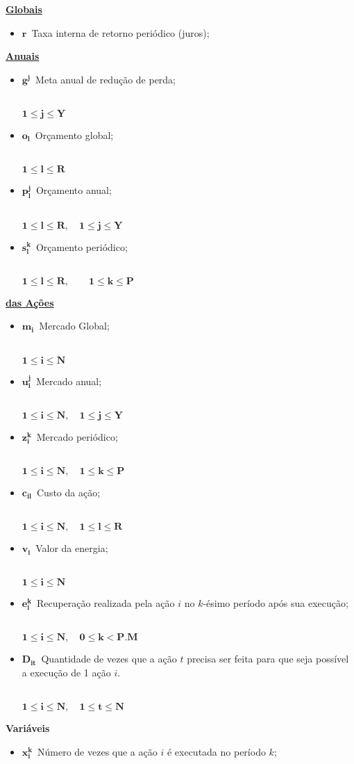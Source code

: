 \documentclass{article}
\newcommand{\topico}[1]{
  \vspace{20pt}
  {\Large \bf #1 }
}
\newcommand{\subtopico}[1]{
  {\large \bf \underline{#1}}
  \\
}
\newcommand{\variavel}[1]{
  { \Large $ \bm{ #1 } \, $}
}
\newcommand{\decorator}[1]{
  {\\ \scriptsize \hspace*{12pt} $ \bm{ #1 } $ }
}
\begin{document}
\begin{multicols}{2}

\subtopico{Globais}
\begin{itemize}
  \item \variavel{r} Taxa interna de retorno periódico (juros);
\end{itemize}

\subtopico{Anuais}
\begin{itemize}
  \item \variavel{g^j} Meta anual de redução de perda;
    \decorator{1 \leq j \leq Y}
  \item \variavel{o_l} Orçamento global;
    \decorator{1 \leq l \leq R}
  \item \variavel{p_l^j} Orçamento anual;
    \decorator{1 \leq l \leq R, \quad 1 \leq j \leq Y}
  \item \variavel{s_l^{k}} Orçamento periódico;
    \decorator{1 \leq l \leq R, \quad \quad 1 \leq k \leq P}
\end{itemize}

\vfill \columnbreak

\subtopico{das Ações}
\begin{itemize}
  \item \variavel{m_i} Mercado Global;
    \decorator{1 \leq i \leq N}
  \item \variavel{u_i^j} Mercado anual;
    \decorator{1 \leq i \leq N, \quad 1 \leq j \leq Y}
  \item \variavel{z_i^k} Mercado periódico;
    \decorator{1 \leq i \leq N, \quad 1 \leq k \leq P}
  \item \variavel{c_{il}} Custo da ação;
    \decorator{1 \leq i \leq N, \quad 1 \leq l \leq R}
  \item \variavel{v_i} Valor da energia;
    \decorator{1 \leq i \leq N}
  \item \variavel{e_i^k} Recuperação realizada pela ação $i$ no $k$-ésimo período
    após sua execução;
    \decorator{1 \leq i \leq N, \quad 0 \leq k < P.M}
  \item \variavel{D_{it}} Quantidade de vezes que a ação $t$ precisa ser
  	feita para que seja possível a execução de 1 ação $i$.
    \decorator{1 \leq i \leq N, \quad 1 \leq t \leq N}
\end{itemize}

\end{multicols}

\pagebreak

\topico{Variáveis}
\begin{itemize}
  \item \variavel{x_i^k} Número de vezes que a ação $i$ é executada no período $k$;
\end{itemize}
\end{document}
